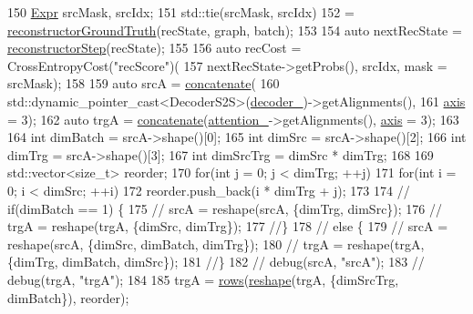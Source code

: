\begin{DoxyCode}
150     \hyperlink{namespacemarian_a498d8baf75b754011078b890b39c8e12}{Expr} srcMask, srcIdx;
151     std::tie(srcMask, srcIdx)
152         = \hyperlink{classmarian_1_1EncoderDecoderRec_a470e9aaddae95fc1a1d5ecaabf06a1fe}{reconstructorGroundTruth}(recState, graph, batch);
153 
154     \textcolor{keyword}{auto} nextRecState = \hyperlink{classmarian_1_1EncoderDecoderRec_ac3a359e69278e31f475f4e6b6acf88e4}{reconstructorStep}(recState);
155 
156     \textcolor{keyword}{auto} recCost = CrossEntropyCost(\textcolor{stringliteral}{"recScore"})(
157         nextRecState->getProbs(), srcIdx, mask = srcMask);
158 
159     \textcolor{keyword}{auto} srcA = \hyperlink{namespacemarian_a2791a2c8f79a938f5cb22ae613680675}{concatenate}(
160         std::dynamic\_pointer\_cast<DecoderS2S>(\hyperlink{classmarian_1_1EncoderDecoder_a3e86046f2f51b1f2b146f366afea9c3b}{decoder\_})->getAlignments(),
161         \hyperlink{namespacemarian_1_1keywords_ace9158eabbddaca833133f12da98b9d6}{axis} = 3);
162     \textcolor{keyword}{auto} trgA = \hyperlink{namespacemarian_a2791a2c8f79a938f5cb22ae613680675}{concatenate}(\hyperlink{classmarian_1_1EncoderDecoderRec_ad4768d4a33e83b3fc280f666df286269}{attention\_}->getAlignments(), 
      \hyperlink{namespacemarian_1_1keywords_ace9158eabbddaca833133f12da98b9d6}{axis} = 3);
163 
164     \textcolor{keywordtype}{int} dimBatch = srcA->shape()[0];
165     \textcolor{keywordtype}{int} dimSrc = srcA->shape()[2];
166     \textcolor{keywordtype}{int} dimTrg = srcA->shape()[3];
167     \textcolor{keywordtype}{int} dimSrcTrg = dimSrc * dimTrg;
168 
169     std::vector<size\_t> reorder;
170     \textcolor{keywordflow}{for}(\textcolor{keywordtype}{int} j = 0; j < dimTrg; ++j)
171       \textcolor{keywordflow}{for}(\textcolor{keywordtype}{int} i = 0; i < dimSrc; ++i)
172         reorder.push\_back(i * dimTrg + j);
173 
174     \textcolor{comment}{// if(dimBatch == 1) \{}
175     \textcolor{comment}{//  srcA = reshape(srcA, \{dimTrg, dimSrc\});}
176     \textcolor{comment}{//  trgA = reshape(trgA, \{dimSrc, dimTrg\});}
177     \textcolor{comment}{//\}}
178     \textcolor{comment}{// else \{}
179     \textcolor{comment}{//  srcA = reshape(srcA, \{dimSrc, dimBatch, dimTrg\});}
180     \textcolor{comment}{//  trgA = reshape(trgA, \{dimTrg, dimBatch, dimSrc\});}
181     \textcolor{comment}{//\}}
182     \textcolor{comment}{// debug(srcA, "srcA");}
183     \textcolor{comment}{// debug(trgA, "trgA");}
184 
185     trgA = \hyperlink{namespacemarian_ace1e9a63d52edc363d70d661cf8d0257}{rows}(\hyperlink{namespacemarian_acd984f43188d0ae23c2a6ef13ae5293f}{reshape}(trgA, \{dimSrcTrg, dimBatch\}), reorder);

\end{DoxyCode}
